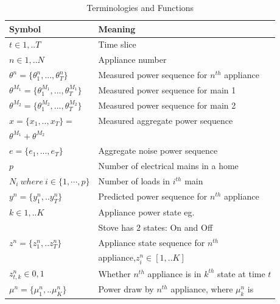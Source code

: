 \documentclass[conference]{IEEEtran}
\begin{document}
\begin{table}[ht!]
\vspace{-12pt}
\caption{Terminologies and Functions}
\vspace{-8pt}
\label{tab:terms}
\begin{tabular}{|l|l|}
\hline
Symbol&Meaning\\[0.1cm]
\hline
$t\in {1,..T}$& Time slice\\[0.1cm]
\hline
$n\in{1,..N}$ & Appliance number\\[0.1cm]
\hline
$\theta^n=\{\theta_1^n,...,\theta_T^n\}$ & Measured power sequence for $n^{th}$ appliance\\[0.1cm]
\hline
$\theta^{M_1}=\{\theta_1^{M_1},...,\theta_T^{M_1}\}$ & Measured power sequence for main 1\\[0.1cm]
\hline
$\theta^{M_2}=\{\theta_1^{M_2},...,\theta_T^{M_2}\}$ & Measured power sequence for main 2\\[0.1cm]
\hline
$x=\{ x_1,..,x_T\}=$ & Measured aggregate power sequence\\[0.1cm]
$\theta^{M_1}+\theta^{M_2}$ &\\[0.1cm]
\hline
$e=\{e_1,...,e_T\}$ & Aggregate noise power sequence\\[0.1cm]
\hline
$p$ & Number of electrical mains in a home\\[0.1cm]
\hline
$N_i \:where\:i \in \{1,\cdots ,p\}$ & Number of loads in $i^{th}$ main\\[0.1cm]
\hline
$y^n=\{y_1^n,..y_T^n\}$ & Predicted power sequence for $n^{th}$ appliance\\[0.1cm]
\hline
$k\in {1,..K}$ & Appliance power state eg. \\
&Stove has 2 states: On and Off\\[0.1cm]
\hline
$z^n=\{z_1^n,..z_T^n\}$ & Appliance state sequence for $n^{th}$ \\[0.1cm]
& appliance,$z_i^n \in [1,..K]$\\[0.1cm]
\hline
$z_{t,k}^n \in{0,1}$ & Whether $n^{th}$ appliance is in $k^{th}$ state at time $t$\\[0.1cm]
\hline 
$\mu^n=\{\mu_1^n,..\mu_K^n\}$ & Power draw by $n^{th}$ appliance, where $\mu_k^n$ is\\

\end{tabular}
\end{table}
\end{document}
